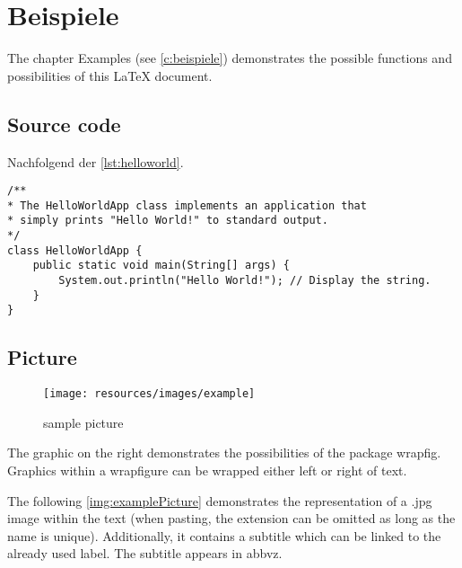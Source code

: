 \chapter{Beispiele} \label{c:beispiele}

The chapter Examples (see \autoref{c:beispiele}) demonstrates the possible functions and possibilities of this LaTeX document.


\section{Source code}

Nachfolgend der \autoref{lst:helloworld}.

\begin{lstlisting}[caption={Hello World}, captionpos=b, label={lst:helloworld}]
/**
* The HelloWorldApp class implements an application that
* simply prints "Hello World!" to standard output.
*/
class HelloWorldApp {
	public static void main(String[] args) {
		System.out.println("Hello World!"); // Display the string.
	}
}
\end{lstlisting}



\section{Picture}

\begin{wrapfigure}{R}{0.5\textwidth}
	\centering
	\texttt{[image: resources/images/example]}
	\caption{sample picture {\cite{PEXELS2015}}}
\end{wrapfigure}

The graphic on the right demonstrates the possibilities of the package \glqq wrapfig\grqq . Graphics within a \glqq wrapfigure\grqq{} can be wrapped either left or right of text.

The following \autoref{img:examplePicture} demonstrates the representation of a \glqq *.jpg\grqq{} image within the text (when pasting, the extension can be omitted as long as the name is unique). Additionally, it contains a subtitle which can be linked to the already used label. The subtitle appears in \gls{abbvz}.


